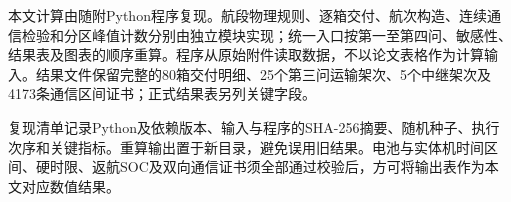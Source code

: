 本文计算由随附Python程序复现。航段物理规则、逐箱交付、航次构造、连续通信检验和分区峰值计数分别由独立模块实现；统一入口按第一至第四问、敏感性、结果表及图表的顺序重算。程序从原始附件读取数据，不以论文表格作为计算输入。结果文件保留完整的80箱交付明细、25个第三问运输架次、5个中继架次及4173条通信区间证书；正式结果表另列关键字段。

复现清单记录Python及依赖版本、输入与程序的SHA-256摘要、随机种子、执行次序和关键指标。重算输出置于新目录，避免误用旧结果。电池与实体机时间区间、硬时限、返航SOC及双向通信证书须全部通过校验后，方可将输出表作为本文对应数值结果。
